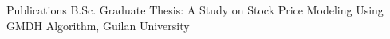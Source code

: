 \begin{rSection}{Publications}
	 B.Sc. Graduate Thesis: A Study on Stock Price Modeling Using GMDH Algorithm, Guilan University\\	
\end{rSection}